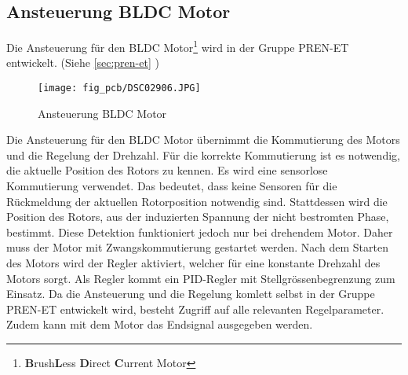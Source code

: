 \subsection{Ansteuerung BLDC Motor}
\label{sec:bldc}
Die Ansteuerung für den BLDC Motor\footnote{\textbf{B}rush\textbf{L}ess 
\textbf{D}irect \textbf{C}urrent Motor} wird in der Gruppe PREN-ET 
entwickelt. (Siehe \ref{sec:pren-et} ) 
\begin{figure}[h!]
    \centering
    \texttt{[image: fig\_pcb/DSC02906.JPG]}
    \caption{Ansteuerung BLDC Motor}
    \label{fig:dc}
\end{figure}

\noindent
Die Ansteuerung für den BLDC Motor übernimmt die Kommutierung des Motors und 
die Regelung der Drehzahl. Für die korrekte Kommutierung ist es notwendig, die 
aktuelle Position des Rotors zu kennen. Es wird eine sensorlose Kommutierung 
verwendet. Das bedeutet, dass keine Sensoren für die Rückmeldung der aktuellen 
Rotorposition notwendig sind. Stattdessen wird die Position des Rotors, aus der 
induzierten Spannung der nicht bestromten Phase, bestimmt. Diese Detektion 
funktioniert jedoch nur bei drehendem Motor. Daher muss der Motor mit 
Zwangskommutierung gestartet werden. Nach dem Starten des Motors wird der 
Regler aktiviert, welcher für eine konstante Drehzahl des Motors sorgt. Als 
Regler kommt ein PID-Regler mit Stellgrössenbegrenzung zum Einsatz. Da die 
Ansteuerung und die Regelung komlett selbst in der Gruppe PREN-ET entwickelt 
wird, besteht Zugriff auf alle relevanten Regelparameter. Zudem kann mit dem 
Motor das Endsignal ausgegeben werden. 
